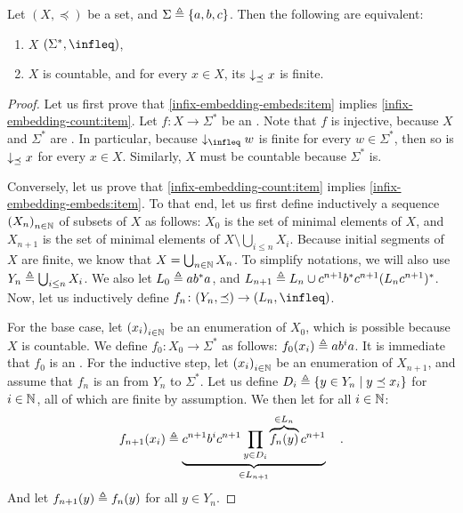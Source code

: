 \begin{theorem}
    \label{infix-embedding:thm}
    Let $(X, \preceq)$ be a  set,
    and $\Sigma \triangleq \{ a,b,c \}$.
    Then the following are equivalent:
    \begin{enumerate}
        \item \label{infix-embedding-embeds:item} 
            $X$  $(\Sigma^*, \infleq)$,
        \item \label{infix-embedding-count:item}
            $X$ is countable, and for every $x \in X$,
            its 
            $\dwset[\preceq]{x}$ is finite.
    \end{enumerate}
\end{theorem}
\begin{proof}
    Let us first prove that \cref{infix-embedding-embeds:item} implies
    \cref{infix-embedding-count:item}. Let $f \colon X \to \Sigma^*$ be an
    . Note that $f$ is injective, because $X$ and $\Sigma^*$
    are . In particular, because $\dwset[\infleq]{w}$ is finite
    for every $w \in \Sigma^*$, then so is $\dwset[\preceq]{x}$
    for every $x \in X$. Similarly, $X$ must be countable
    because $\Sigma^*$ is.

    Conversely, let us prove that \cref{infix-embedding-count:item} implies
    \cref{infix-embedding-embeds:item}. To that end, let us first define
    inductively a sequence $\seqof{X_n}$ of subsets of $X$ as follows: $X_0$ is
    the set of minimal elements of $X$, and $X_{n+1}$ is the set of minimal
    elements of $X \setminus \bigcup_{i \leq n} X_i$. Because initial segments
    of $X$ are finite, we know that $X = \bigcup_{n \in \mathbb{N}} X_n$. To
    simplify notations, we will also use $Y_n \triangleq \bigcup_{i \leq n} X_i$.
    We also let $L_0 \triangleq a b^* a$, and 
    $L_{n+1} \triangleq L_n \cup c^{n+1} b^* c^{n+1} (L_n c^{n+1})^*$.
    Now, let us inductively define  $f_n \colon (Y_n,\preceq) \to
    (L_n, \infleq)$.

    For the base case, let $\seqof{x_i}[i \in \Nat]$ be an enumeration of
    $X_0$, which is possible because $X$ is countable. We define $f_0 \colon
    X_0 \to \Sigma^*$ as follows: $f_0(x_i) \triangleq a b^i a$. It is immediate
    that $f_0$ is an . For the inductive step, let $\seqof{x_i}[i
    \in \Nat]$ be an enumeration of $X_{n+1}$, and assume that $f_n$ is an
     from $Y_n$ to $\Sigma^*$.
    Let us define $D_i \triangleq \{  y \in Y_n  \mid  y \preceq x_i  \}$
    for $i \in \mathbb{N}$, all of which are finite by assumption.
    We then let for all $i \in \mathbb{N}$:
    \begin{equation*}
        f_{n+1}(x_i) \triangleq 
        \underbrace{c^{n+1} b^i c^{n+1} \prod_{y \in D_i} \overbrace{f_n(y)}^{\in L_n} c^{n+1}}_{\in L_{n+1}}
        \quad .
    \end{equation*}
    And let $f_{n+1}(y) \triangleq f_n(y)$ for all $y \in Y_n$.


\end{proof}

